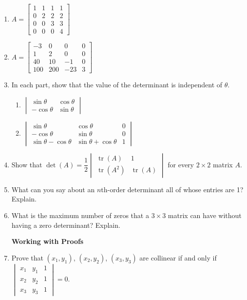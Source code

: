 \documentclass{article}
\theoremstyle{mystyle}
\begin{document}
\begin{enumerate}
\item[30.] $A=\begin{bmatrix}1&1&1&1\\0&2&2&2\\0&0&3&3\\0&0&0&4\end{bmatrix}$

\item[32.] $A=\begin{bmatrix}-3&0&0&0\\1&2&0&0\\40&10&-1&0\\100&200&-23&3\end{bmatrix}$

\item[33.] In each part, show that the value of the determinant is independent of $\theta$.
\begin{enumerate}
  \item[(a)] $\begin{vmatrix}\sin\theta&\cos\theta\\-\cos\theta&\sin\theta\end{vmatrix}$
  \item[(b)] $\begin{vmatrix}\sin\theta&\cos\theta&0\\-\cos\theta&\sin\theta&0\\\sin\theta-\cos\theta&\sin\theta+\cos\theta&1\end{vmatrix}$
\end{enumerate}

\item[36.] Show that $\det(A)=\dfrac{1}{2}\begin{vmatrix}\operatorname{tr}(A)&1\\\operatorname{tr}(A^2)&\operatorname{tr}(A)\end{vmatrix}$ for every $2\times2$ matrix $A$.

\item[37.] What can you say about an $n$th-order determinant all of whose entries are 1? Explain.

\item[38.] What is the maximum number of zeros that a $3\times3$ matrix can have without having a zero determinant? Explain.

\noindent\textbf{Working with Proofs}

\item[40.] Prove that $(x_1,y_1)$, $(x_2,y_2)$, $(x_3,y_3)$ are collinear if and only if
$\begin{vmatrix}x_1&y_1&1\\x_2&y_2&1\\x_3&y_3&1\end{vmatrix}=0$.


\end{enumerate}
\end{document}
